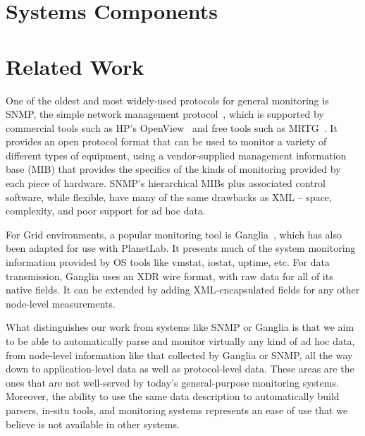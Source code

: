 \documentclass{sigplanconf}
\begin{document}
\section{Systems Components}
\label{sec:framework}


% 

\section{Related Work}
\label{sec:related}

One of the oldest and most widely-used protocols for general monitoring
is SNMP, the simple network management protocol~\cite{snmprfc1157},
which is supported by commercial tools such as HP's
OpenView~\cite{openview} and free tools such as MRTG~\cite{mrtg}. It
provides an open protocol format that can be used to monitor a variety
of different types of equipment, using a vendor-supplied management
information base (MIB) that provides the specifics of the kinds of
monitoring provided by each piece of hardware. SNMP's hierarchical
MIBs plus associated control software, while flexible, have many of
the same drawbacks as XML -- space, complexity, and poor support for
ad hoc data.

For Grid environments, a popular monitoring tool is
Ganglia~\cite{ganglia}, which has also been adapted for use with
PlanetLab. It presents much of the system monitoring information
provided by OS tools like vmstat, iostat, uptime, etc. For data
transmission, Ganglia uses an XDR wire format, with raw data for all
of its native fields.  It can be extended by adding XML-encapsulated
fields for any other node-level measurements. 

What distinguishes our work from systems like SNMP or Ganglia is
that we aim to be able to automatically parse and monitor virtually
any kind of ad hoc data, from node-level information like that
collected by Ganglia or SNMP, all the way down to application-level
data as well as protocol-level data. These areas are the ones that are
not well-served by today's general-purpose monitoring
systems. Moreover, the ability to use the same data description to
automatically build parsers, in-situ tools, and monitoring systems
represents an ease of use that we believe is not available in other
systems.
\end{document}

